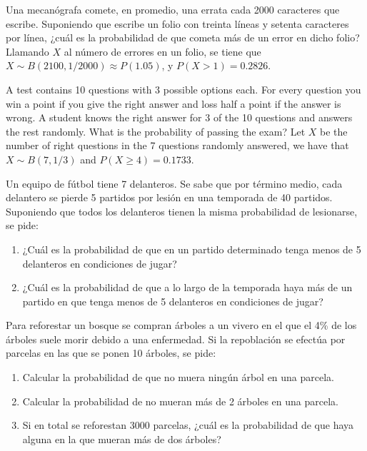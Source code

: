 {Una mecanógrafa comete, en promedio, una errata cada 2000 caracteres que escribe.
Suponiendo que escribe un folio con treinta líneas y setenta caracteres por línea, ¿cuál es la probabilidad de que
cometa más de un error en dicho folio?}
{Llamando $X$ al número de errores en un folio, se tiene que $X\sim B(2100,1/2000)\approx P(1.05)$, y $P(X>1)=0.2826$.
}
{}


{A test contains 10 questions with 3 possible options each. 
For every question you win a point if you give the right answer and loss half a point if the answer is wrong. 
A student knows the right answer for 3 of the 10 questions and answers the rest randomly. 
What is the probability of passing the exam?}
{Let $X$ be the number of right questions in the 7 questions randomly answered, we have that $X\sim B(7,1/3)$ and $P(X\geq 4)=0.1733$.}
{}


{Un equipo de fútbol tiene 7 delanteros. Se sabe que por término medio, cada delantero se pierde 5 partidos por lesión en una temporada de 40 partidos. Suponiendo que todos los delanteros tienen la misma probabilidad de lesionarse, se pide:
\begin{enumerate}
\item  ¿Cuál es la probabilidad de que en un partido determinado tenga menos de 5 delanteros en condiciones de jugar?
\item  ¿Cuál es la probabilidad de que a lo largo de la temporada haya más de un partido en que tenga menos de 5  delanteros en condiciones de jugar?
\end{enumerate}
}
{}
{}


{Para reforestar un bosque se compran árboles a un vivero en el que el 4\% de los árboles suele morir debido a una enfermedad. Si la repoblación se efectúa por parcelas en las que se ponen 10 árboles, se pide:
\begin{enumerate}
\item Calcular la probabilidad de que no muera ningún árbol en una parcela.
\item Calcular la probabilidad de no mueran más de 2 árboles en una parcela.
\item Si en total se reforestan 3000 parcelas, ¿cuál es la probabilidad de que haya alguna en la que mueran más de dos árboles?
\end{enumerate}
}
{}
{}


